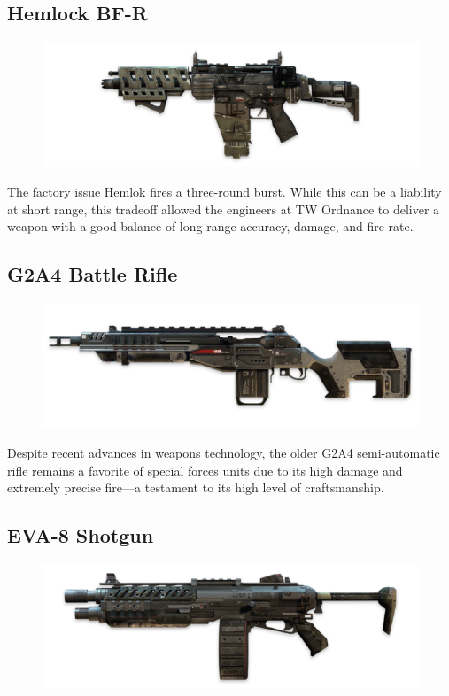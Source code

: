 \documentclass[9pt, openany]{extbook}
\begin{document}
\subsection{Hemlock BF-R}
\begin{figure}
\vspace*{-2em}
\includegraphics[width=\linewidth]{HemlokBFR}
\end{figure}
The factory issue Hemlok fires a three-round burst. While this can be a liability at short range, this tradeoff allowed the engineers at TW Ordnance to deliver a weapon with a good balance of long-range accuracy, damage, and fire rate.

\subsection{G2A4 Battle Rifle}
\begin{figure}
\vspace*{-2em}
\includegraphics[width=\linewidth]{G2A4Rifle}
\end{figure}


Despite recent advances in weapons technology, the older G2A4 semi-automatic rifle remains a favorite of special forces units due to its high damage and extremely precise fire---a testament to its high level of craftsmanship.

\subsection{EVA-8 Shotgun}
\begin{figure}
\vspace*{-2em}
\includegraphics[width=\linewidth]{EVA8Shotgun}
\end{figure}
\end{document}
